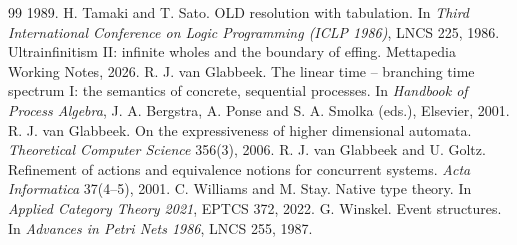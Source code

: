 \documentclass[11pt]{article}
\theoremstyle{remark}
\begin{document}
\begin{thebibliography}{99}
  1989.
 H. Tamaki and T. Sato. OLD resolution with tabulation. In \emph{Third International
  Conference on Logic Programming (ICLP 1986)}, LNCS 225, 1986.
 Ultrainfinitism II: infinite wholes and the boundary of effing. Mettapedia
  Working Notes, 2026.
 R. J. van Glabbeek. The linear time -- branching time spectrum I: the semantics of
  concrete, sequential processes. In \emph{Handbook of Process Algebra}, J. A. Bergstra, A. Ponse and S.
  A. Smolka (eds.), Elsevier, 2001.
 R. J. van Glabbeek. On the expressiveness of higher dimensional automata.
  \emph{Theoretical Computer Science} 356(3), 2006.
 R. J. van Glabbeek and U. Goltz. Refinement of actions and equivalence notions
  for concurrent systems. \emph{Acta Informatica} 37(4--5), 2001.
 C. Williams and M. Stay. Native type theory. In \emph{Applied Category Theory 2021},
  EPTCS 372, 2022.
 G. Winskel. Event structures. In \emph{Advances in Petri Nets 1986}, LNCS 255, 1987.
\end{thebibliography}
\end{document}
